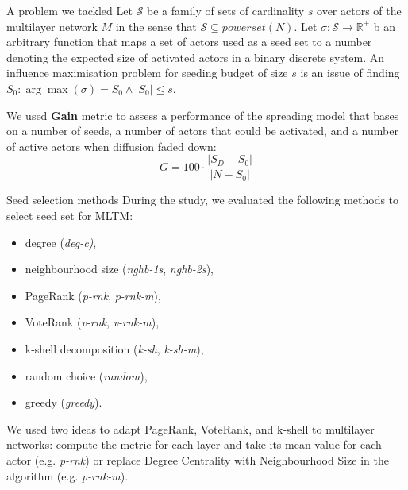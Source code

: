 \documentclass[final]{beamer}
\newlength{\colwidth}
\begin{document}
\begin{frame}[t, fragile]
\begin{columns}[t]
\begin{column}{\colwidth}
\begin{block}{A problem we tackled}
    Let $\mathcal{S}$ be a family of sets of cardinality $s$ over actors of
    the multilayer network $M$ in the sense that $\mathcal{S} \subseteq
    powerset(N)$. Let $\sigma: \mathcal{S} \rightarrow \mathbb{R^{+}}$ b
    an arbitrary function that maps a set of actors used as a seed set to
    a number denoting the expected size of activated actors in a binary discrete system. An influence maximisation problem for seeding budget of size $s$ is an issue of finding $ S_{0}: \arg\max(\sigma) = S_{0} \wedge |S_{0}| \leq s$.
    
    We used \textbf{Gain} metric to assess a performance of the spreading model that bases on a number of seeds, a number of actors that could be activated, and a number of active actors when diffusion faded down:
    \begin{equation*}
        G = 100 \cdot \frac{|S_{D} - S_{0}|}{|N - S_{0}|}
    \end{equation*}
\end{block}

\begin{block}{Seed selection methods}
    During the study, we evaluated the following methods to select seed set for MLTM:
    \begin{itemize}
        \item degree (\textit{deg-c)},
        \item neighbourhood size (\textit{nghb-1s}, \textit{nghb-2s}),
        \item PageRank (\textit{p-rnk}, \textit{p-rnk-m}),
        \item VoteRank (\textit{v-rnk}, \textit{v-rnk-m}),
        \item k-shell decomposition (\textit{k-sh}, \textit{k-sh-m}),
        \item random choice (\textit{random}),
        \item greedy (\textit{greedy}).
    \end{itemize}
    We used two ideas to adapt PageRank, VoteRank, and k-shell to multilayer networks: compute the metric for each layer and take its mean value for each actor (e.g. \textit{p-rnk}) or replace Degree Centrality with Neighbourhood Size in the algorithm (e.g. \textit{p-rnk-m}).
\end{block}

\end{column}


\end{columns}
\end{frame}
\end{document}
